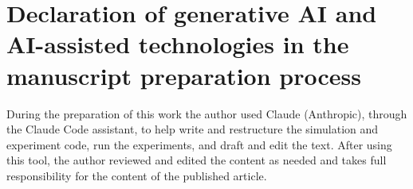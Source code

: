 \documentclass[11pt,a4paper]{article}
\begin{document}
\section*{Declaration of generative AI and AI-assisted technologies in the manuscript preparation process}
During the preparation of this work the author used Claude (Anthropic), through the Claude Code assistant, to help write and restructure the simulation and experiment code, run the experiments, and draft and edit the text. After using this tool, the author reviewed and edited the content as needed and takes full responsibility for the content of the published article.
\end{document}
